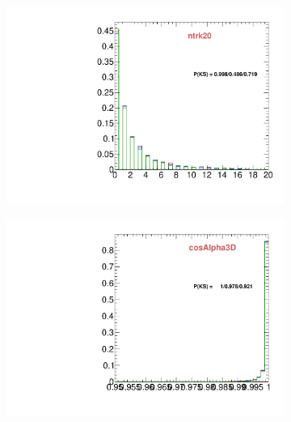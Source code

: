 \begin{figure}
        \centering
        \begin{subfigure}[b]{0.2\textwidth}
                \centering
                \includegraphics[width=\textwidth]{Figures/VariablesComparison/MC_endcaps_figs_3h/ntrk20}
                \label{fig:MC_endcaps_ntrk20_3h}
        \end{subfigure}
        \begin{subfigure}[b]{0.2\textwidth}
                \centering
                \includegraphics[width=\textwidth]{Figures/VariablesComparison/MC_endcaps_figs_3h/cosAlpha3D}
                \label{fig:MC_endcaps_cosAlpha3D_3h}
        \end{subfigure}
        \begin{subfigure}[b]{0.2\textwidth}

\end{subfigure}
\end{figure}

